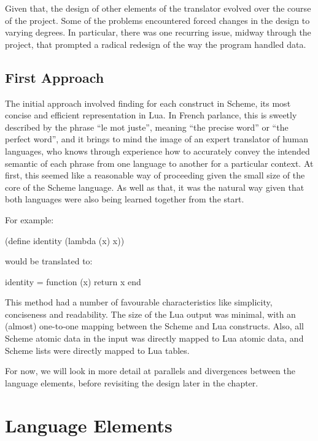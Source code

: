 Given that, the design of other elements of the translator evolved over the
course of the project. Some of the problems encountered forced changes in the
design to varying degrees. In particular, there was one recurring issue, midway
through the project, that prompted a radical redesign of the way the program
handled data.

\subsection{First Approach}

The initial approach involved finding for each construct in Scheme, its most
concise and efficient representation in Lua. In French parlance, this is sweetly
described by the phrase ``le mot juste'', meaning ``the precise word'' or ``the
perfect word'', and it brings to mind the image of an expert translator of
human languages, who knows through experience how to accurately convey the
intended semantic of each phrase from one language to another for a particular
context. At first, this seemed like a reasonable way of proceeding given the
small size of the core of the Scheme language. As well as that, it was the
natural way given that both languages were also being learned together from the
start.

\begin{framed}
For example:
\begin{center}\ttfamily (define identity (lambda (x) x))\end{center}

would be translated to:
\begin{center}\ttfamily identity = function (x) return x end\end{center}
\end{framed}

This method had a number of favourable characteristics like simplicity,
conciseness and readability. The size of the Lua output was minimal, with an
(almost) one-to-one mapping between the Scheme and Lua constructs. Also, all
Scheme atomic data in the input was directly mapped to Lua atomic data, and
Scheme lists were directly mapped to Lua tables.

For now, we will look in more detail at parallels and divergences between the
language elements, before revisiting the design later in the chapter.


\section{Language Elements}

